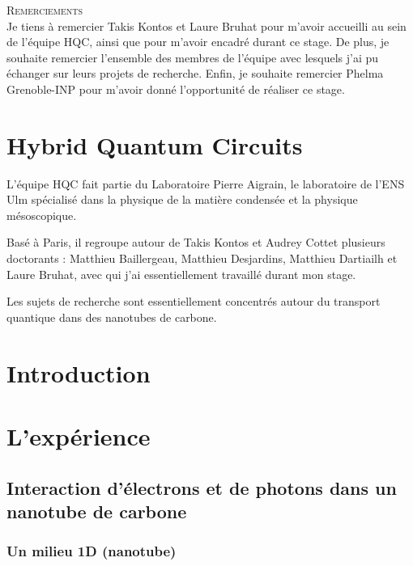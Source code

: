 \documentclass[a4paper,11pt]{report}
\date{}
\title{}
\author{}
\begin{document}
\nocite{*}


\begin{center}
\textsc{\Large Remerciements}
\\
\vspace{0.5cm}
Je tiens à remercier Takis Kontos et Laure Bruhat pour m'avoir accueilli au sein de l'équipe HQC, ainsi que pour m'avoir encadré durant ce stage. De plus, je souhaite remercier l'ensemble des membres de l'équipe avec lesquels j'ai pu échanger sur leurs projets de recherche. Enfin, je souhaite remercier Phelma Grenoble-INP pour m'avoir donné l'opportunité de réaliser ce stage.
\end{center}

\chapter*{Hybrid Quantum Circuits}
L'équipe HQC fait partie du Laboratoire Pierre Aigrain, le laboratoire de l'ENS Ulm spécialisé dans la physique de la matière condensée et la physique mésoscopique.

Basé à Paris, il regroupe autour de Takis Kontos et Audrey Cottet plusieurs doctorants : Matthieu Baillergeau, Matthieu Desjardins, Matthieu Dartiailh et Laure Bruhat, avec qui j'ai essentiellement travaillé durant mon stage.

Les sujets de recherche sont essentiellement concentrés autour du transport quantique dans des nanotubes de carbone.

\chapter*{Introduction} %

\chapter{L'expérience}

\section{Interaction d'électrons et de photons dans un nanotube de carbone}
\subsection{Un milieu 1D (nanotube)}
\end{document}
